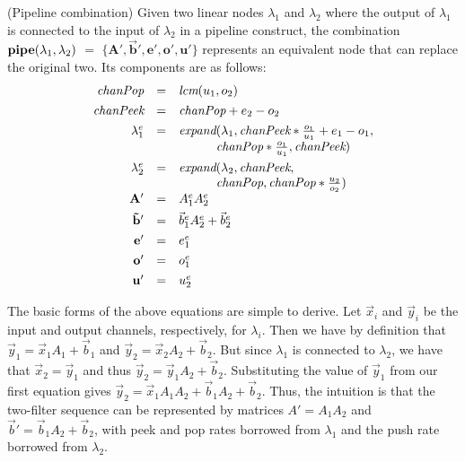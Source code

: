 \begin{transformation} (Pipeline combination)
Given two linear nodes $\lambda_1$ and $\lambda_2$ where the output of
$\lambda_1$ is connected to the input of $\lambda_2$ in a pipeline
construct, the combination $\mbox{\bf pipe}(\lambda_1, \lambda_2)$ $=$
$\mathbf{ \{A', {\vec b}', e', o', u'\}}$ represents an equivalent node that
can replace the original two.  Its components are as follows:
\begin{equation} \nonumber
\begin{array}{rcl}
\mt{chanPop} & = & \mt{lcm}(u_1, o_2) \\ ~ \vspace{-8pt} \\
\mt{chanPeek} & = & \mt{chanPop} + e_2 - o_2 \\ ~ \vspace{-8pt} \\
\lambda_1^e & = & \mt{expand}(\lambda_1, \mt{chanPeek} * \frac{o_1}{u_1} + e_1 - o_1, \\
~ & ~ & ~\hspace{0.32in}~ \mt{chanPop} * \frac{o_1}{u_1}, \mt{chanPeek}) \\ ~ \vspace{-8pt} \\
\lambda_2^e & = & \mt{expand}(\lambda_2, \mt{chanPeek}, \\
~ & ~ & ~\hspace{0.32in}~ \mt{chanPop}, \mt{chanPop} * \frac{u_2}{o_2}) \\
\mathbf{A'} & = & A_1^e A_2^e \\ ~ \vspace{-8pt} \\
\mathbf{{\vec b}'} & = & {\vec b}_1^e A_2^e + {\vec b}_2^e \\ ~ \vspace{-8pt} \\
\mathbf{e'} & = & e_1^e \\ ~ \vspace{-8pt} \\
\mathbf{o'} & = & o_1^e \\ ~ \vspace{-8pt} \\
\mathbf{u'} & = & u_2^e
\end{array}
\end{equation}
\end{transformation}

The basic forms of the above equations are simple to derive.  Let
${\vec x}_i$ and ${\vec y}_i$ be the input and output channels, respectively, for
$\lambda_i$.  Then we have by definition that ${\vec y}_1 = {\vec x}_1 A_1 + {\vec b}_1$
and ${\vec y}_2 = {\vec x}_2 A_2 + {\vec b}_2$.  But since $\lambda_1$ is connected to
$\lambda_2$, we have that ${\vec x}_2 = {\vec y}_1$ and thus 
${\vec y}_2 = {\vec y}_1 A_2 + {\vec b}_2$.
Substituting the value of ${\vec y}_1$ from our first equation gives ${\vec y}_2 =
{\vec x}_1 A_1 A_2 + {\vec b}_1 A_2 + {\vec b}_2$.  Thus, the intuition is that the
two-filter sequence can be represented by matrices $A' = A_1 A_2$
and ${\vec b}' = {\vec b}_1 A_2 + {\vec b}_2$, with peek and pop rates borrowed from
$\lambda_1$ and the push rate borrowed from $\lambda_2$.

